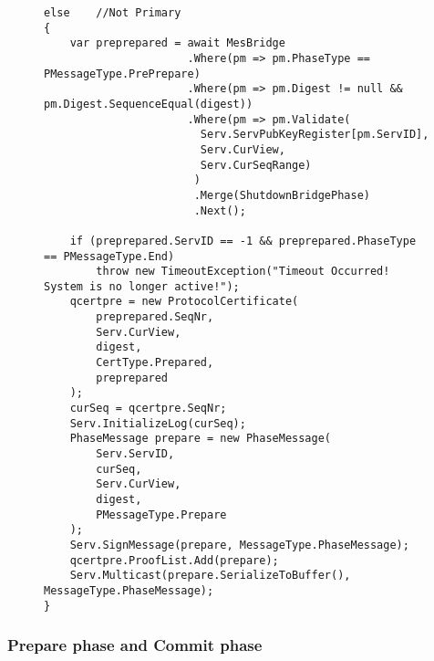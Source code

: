 \begin{figure}[H]
	\centering
	\begin{lstlisting}[label = code:Pre-PrepareNonPrimary, caption= Pre-prepare phase for non-primary replica, captionpos = b, basicstyle=\scriptsize]
else	//Not Primary
{ 
    var preprepared = await MesBridge
    	              .Where(pm => pm.PhaseType == PMessageType.PrePrepare)
                      .Where(pm => pm.Digest != null && pm.Digest.SequenceEqual(digest))
                      .Where(pm => pm.Validate(
                        Serv.ServPubKeyRegister[pm.ServID],
                        Serv.CurView, 
                        Serv.CurSeqRange)
                       )
                       .Merge(ShutdownBridgePhase)
                       .Next();
                
    if (preprepared.ServID == -1 && preprepared.PhaseType == PMessageType.End) 
        throw new TimeoutException("Timeout Occurred! System is no longer active!");
    qcertpre = new ProtocolCertificate(
        preprepared.SeqNr, 
        Serv.CurView, 
        digest, 
        CertType.Prepared, 
        preprepared
    );
    curSeq = qcertpre.SeqNr; 
    Serv.InitializeLog(curSeq);
    PhaseMessage prepare = new PhaseMessage(
        Serv.ServID, 
        curSeq, 
        Serv.CurView, 
        digest, 
        PMessageType.Prepare
    );
    Serv.SignMessage(prepare, MessageType.PhaseMessage);
    qcertpre.ProofList.Add(prepare);
    Serv.Multicast(prepare.SerializeToBuffer(), MessageType.PhaseMessage);
}
	\end{lstlisting}
\end{figure}		

\subsubsection{Prepare phase and Commit phase}



